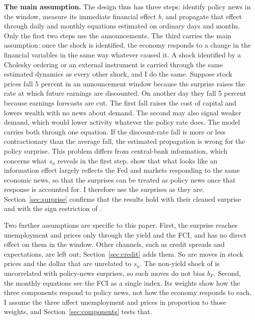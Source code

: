 \documentclass[11pt]{article}
\begin{document}
\textbf{The main assumption.} The design thus has three steps: identify policy news in the window, measure its immediate financial effect $b$, and propagate that effect through daily and monthly equations estimated on ordinary days and months. Only the first two steps use the announcements. The third carries the main assumption: once the shock is identified, the economy responds to a change in the financial variables in the same way whatever caused it. A shock identified by a Cholesky ordering or an external instrument is carried through the same estimated dynamics as every other shock, and I do the same. Suppose stock prices fall 5 percent in an announcement window because the surprise raises the rate at which future earnings are discounted. On another day they fall 5 percent because earnings forecasts are cut. The first fall raises the cost of capital and lowers wealth with no news about demand. The second may also signal weaker demand, which would lower activity whatever the policy rate does. The model carries both through one equation. If the discount-rate fall is more or less contractionary than the average fall, the estimated propagation is wrong for the policy surprise. This problem differs from central-bank information, which concerns what $s_a$ reveals in the first step. \citet{bauer2023aer} show that what looks like an information effect largely reflects the Fed and markets responding to the same economic news, so that the surprises can be treated as policy news once that response is accounted for. I therefore use the surprises as they are. Section~\ref{sec:surprise} confirms that the results hold with their cleaned surprise and with the sign restriction of \citet{jarocinski2020}.

Two further assumptions are specific to this paper. First, the surprise reaches unemployment and prices only through the yield and the FCI, and has no direct effect on them in the window. Other channels, such as credit spreads and expectations, are left out; Section~\ref{sec:credit} adds them. So are moves in stock prices and the dollar that are unrelated to $s_a$. The non-yield shock of \citet{boehm2024} is uncorrelated with policy-news surprises, so such moves do not bias $b_F$. Second, the monthly equations see the FCI as a single index. Its weights show how the three components respond to policy news, not how the economy responds to each. I assume the three affect unemployment and prices in proportion to those weights, and Section~\ref{sec:components} tests that.
\end{document}
